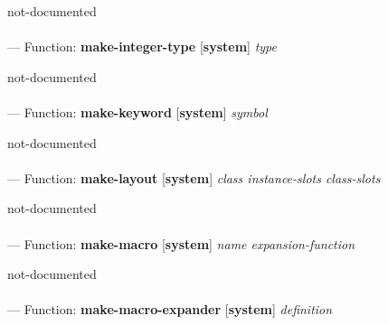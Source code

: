 \begin{adjustwidth}{5em}{5em}
not-documented
\end{adjustwidth}

\paragraph{}
\label{SYSTEM:MAKE-INTEGER-TYPE}
--- Function: \textbf{make-integer-type} [\textbf{system}] \textit{type}

\begin{adjustwidth}{5em}{5em}
not-documented
\end{adjustwidth}

\paragraph{}
\label{SYSTEM:MAKE-KEYWORD}
--- Function: \textbf{make-keyword} [\textbf{system}] \textit{symbol}

\begin{adjustwidth}{5em}{5em}
not-documented
\end{adjustwidth}

\paragraph{}
\label{SYSTEM:MAKE-LAYOUT}
--- Function: \textbf{make-layout} [\textbf{system}] \textit{class instance-slots class-slots}

\begin{adjustwidth}{5em}{5em}
not-documented
\end{adjustwidth}

\paragraph{}
\label{SYSTEM:MAKE-MACRO}
--- Function: \textbf{make-macro} [\textbf{system}] \textit{name expansion-function}

\begin{adjustwidth}{5em}{5em}
not-documented
\end{adjustwidth}

\paragraph{}
\label{SYSTEM:MAKE-MACRO-EXPANDER}
--- Function: \textbf{make-macro-expander} [\textbf{system}] \textit{definition}


